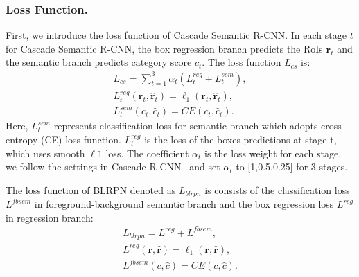 \documentclass[runningheads]{llncs}
\begin{document}
\subsubsection{Loss Function.}
First, we introduce the loss function of Cascade Semantic R-CNN. In each stage $t$ for Cascade Semantic R-CNN, the box regression branch predicts the RoIs $\mathbf{r}_{t}$ and the semantic branch predicts category score $c_{t}$. The loss function $L_{cs}$ is:
\begin{equation}
\begin{split}
    L_{cs} = \sum_{t=1}^{3}\alpha_{t}(L_{t}^{reg}+L_{t}^{sem}), \\
    L_{t}^{reg}(\mathbf{r}_{t}, \widehat{\mathbf{r}}_{t}) = \ell_{1}(\mathbf{r}_{t}, \widehat{\mathbf{r}}_{t}), \\ 
    L_{t}^{sem}(c_{t}, \widehat{c}_{t}) = CE(c_{t}, \widehat{c}_{t}).
\end{split}
\end{equation}
Here, $L_{t}^{sem}$ represents classification loss for semantic branch which adopts cross-entropy (CE) loss function. $L_{t}^{reg}$ is the loss of the boxes predictions at stage t, which uses smooth $\ell{1}$ loss. The coefficient $\alpha_{t}$ is the loss weight for each stage, we follow the settings in Cascade R-CNN~\cite{cascadercnn} and set $\alpha_{t}$ to [1,0.5,0.25] for 3 stages. 

The loss function of BLRPN denoted as $L_{blrpn}$ is consists of the classification loss $L^{fbsem}$ in foreground-background semantic branch and the box regression loss $L^{reg}$ in regression branch:
\begin{equation}
\begin{split}
    L_{blrpn} = L^{reg} + L^{fbsem}, \\
    L^{reg}(\mathbf{r}, \widehat{\mathbf{r}}) = \ell_{1}(\mathbf{r}, \widehat{\mathbf{r}}), \\ 
    L^{fbsem}(c, \widehat{c}) = CE(c, \widehat{c}).
\end{split}
\end{equation}
\end{document}
